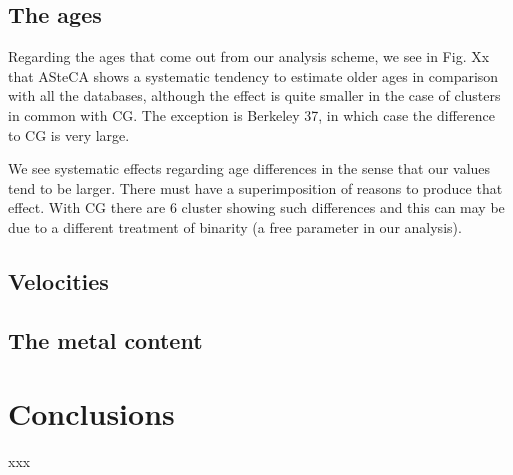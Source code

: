 \documentclass[draft]{aa}
\begin{document}
\subsection{The ages}
Regarding the ages that come out from our analysis scheme, we see in Fig. Xx that
ASteCA shows a systematic tendency to estimate older ages in comparison with all
the databases, although the effect is quite smaller in the case of clusters in
common with CG. The exception is Berkeley 37, in which case the difference to CG
is very large. 

We see systematic effects regarding age differences in the sense that our values
tend to be larger. There must have a superimposition of reasons to produce that
effect. With CG there are 6 cluster showing such differences and this can may be
due to a different treatment of binarity (a free parameter in our analysis).



\subsection{Velocities}



\subsection{The metal content}




\section{Conclusions}
 \label{sec:conclusions}


 xxx






\end{document}

